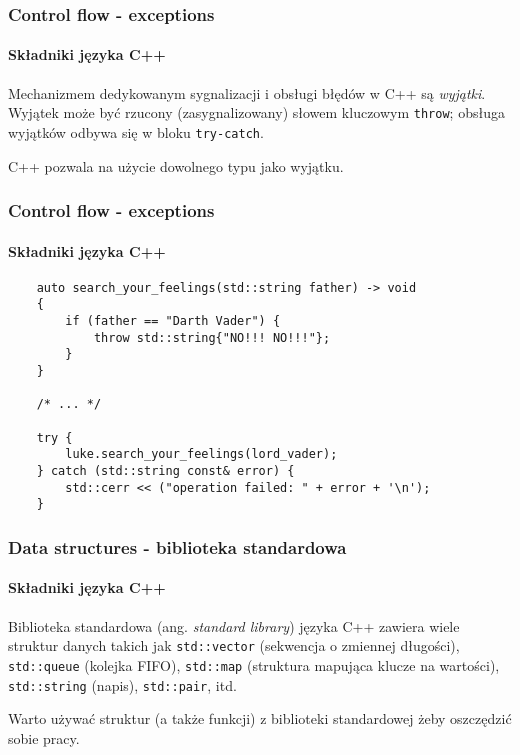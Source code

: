 \documentclass[aspectratio=169]{beamer}
\begin{document}
\begin{frame}
    \frametitle{Control flow - exceptions}
    \framesubtitle{Składniki języka C++}

    Mechanizmem dedykowanym sygnalizacji i obsługi błędów w C++ są
    \emph{wyjątki}. Wyjątek może być rzucony (zasygnalizowany) słowem kluczowym
    {\tt throw}; obsługa wyjątków odbywa się w bloku {\tt try-catch}.

    \vspace{1em}

    C++ pozwala na użycie dowolnego typu jako wyjątku.
\end{frame}

\begin{frame}[fragile]
    \frametitle{Control flow - exceptions}
    \framesubtitle{Składniki języka C++}

    {\footnotesize
    \begin{lstlisting}
    auto search_your_feelings(std::string father) -> void
    {
        if (father == "Darth Vader") {
            throw std::string{"NO!!! NO!!!"};
        }
    }

    /* ... */

    try {
        luke.search_your_feelings(lord_vader);
    } catch (std::string const& error) {
        std::cerr << ("operation failed: " + error + '\n');
    }
    \end{lstlisting}}
\end{frame}

\begin{frame}
    \frametitle{Data structures - biblioteka standardowa}
    \framesubtitle{Składniki języka C++}

    Biblioteka standardowa (ang. \emph{standard library}) języka C++ zawiera
    wiele struktur danych takich jak
    {\tt std::vector} (sekwencja o zmiennej długości),
    {\tt std::queue} (kolejka FIFO),
    {\tt std::map} (struktura mapująca klucze na wartości),
    {\tt std::string} (napis),
    {\tt std::pair}, itd.

    \vspace{1em}

    Warto używać struktur (a także funkcji) z biblioteki standardowej żeby
    oszczędzić sobie pracy.
\end{frame}
\end{document}
